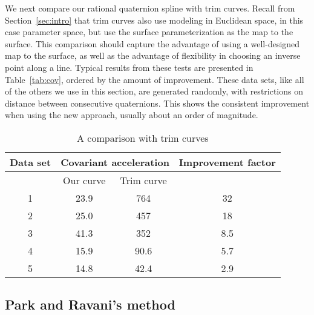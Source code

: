 We next compare our rational quaternion spline with trim curves.
Recall from Section~\ref{sec:intro} that trim curves also use modeling 
in Euclidean space, in this case parameter space, 
but use the surface parameterization as the map to the surface.
This comparison should capture the advantage of using a well-designed map to the
surface, as well as the advantage of 
flexibility in choosing an inverse point along a line.
%
%
Typical results from these tests are presented in Table~\ref{tab:cov},
ordered by the amount of improvement.
These data sets, like all of the others we use in this section, 
are generated randomly, with restrictions on distance between consecutive
quaternions.
This shows the consistent improvement when using the new approach,
usually about an order of magnitude.

\begin{table}
\label{tab:cov2}
\begin{tabular}{|c|c|c|c|}  	\hline
Data set & \multicolumn{2}{c|}{Covariant acceleration} & Improvement factor \\ \hline
	 & Our curve  & Trim curve & \\ \hline
1 & 23.9 & 764 & 32 \\ \hline
2 & 25.0 & 457 & 18 \\ \hline
3 & 41.3 & 352 & 8.5\\ \hline
4 & 15.9 & 90.6 & 5.7 \\ \hline
5 & 14.8 & 42.4 & 2.9 \\ \hline
\end{tabular}
\caption{A comparison with trim curves}
\end{table}

\subsection{Park and Ravani's method}

